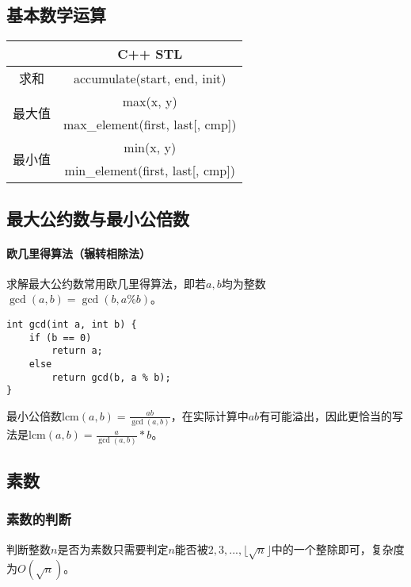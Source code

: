 \subsection{基本数学运算}

\begin{table}[htbp]
	\centering
	\begin{tabular}{cc}
		\hline
		& C++ STL \\
		\hline
		求和 & accumulate(start, end, init) \\
		\hline
		\multirow{2}{*}{最大值} & max(x, y)  \\
		& max\_element(first, last[, cmp])  \\
		\hline
		\multirow{2}{*}{最小值} & min(x, y)  \\
		& min\_element(first, last[, cmp])  \\
		\hline
	\end{tabular}
\end{table}

\subsection{最大公约数与最小公倍数}

\paragraph{欧几里得算法（辗转相除法）}

求解最大公约数常用欧几里得算法，即若$a,b$均为整数$\gcd(a,b)=\gcd(b,a\%b)$。

\begin{lstlisting}
int gcd(int a, int b) {
	if (b == 0)
		return a;
	else
		return gcd(b, a % b);
}
\end{lstlisting}

最小公倍数$\displaystyle{\textrm{lcm}(a,b)=\frac{ab}{\gcd(a,b)}}$，在实际计算中$ab$有可能溢出，因此更恰当的写法是$\displaystyle{\textrm{lcm}(a,b)=\frac{a}{\gcd(a,b)}*b}$。

\subsection{素数}

\subsubsection{素数的判断}

判断整数$n$是否为素数只需要判定$n$能否被$2,3,...,\lfloor\sqrt{n}\rfloor$中的一个整除即可，复杂度为$O(\sqrt{n})$。

